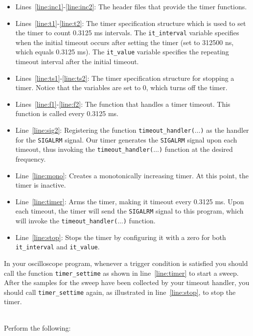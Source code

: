 \documentclass[epsfig,10pt,fullpage]{article}
\begin{document}
\begin{itemize}
\item Lines~\ref{line:inc1}-\ref{line:inc2}: The header files that provide the timer 
functions.
\item Lines~\ref{line:t1}-\ref{line:t2}: The timer specification structure which is used to set the timer to count 0.3125 ms intervals. The \texttt{it\_interval} variable specifies when the initial timeout occurs after setting the timer (set to 312500 ns, which equals 0.3125 ms). The \texttt{it\_value} variable specifies the repeating timeout interval after the initial timeout.
\item Lines~\ref{line:ts1}-\ref{line:ts2}: The timer specification structure for stopping a timer. Notice that the variables are set to 0, which turns off the timer.
\item Lines~\ref{line:f1}-\ref{line:f2}: The function that handles a timer timeout. This function is called every 0.3125 ms. 
\item Line~\ref{line:sig2}: Registering the function \texttt{timeout\_handler($\ldots$)} as 
the handler for the \texttt{SIGALRM} signal. Our timer generates the 
\texttt{SIGALRM} signal upon each timeout, thus invoking the
\texttt{timeout\_handler($\ldots$)} function at the desired frequency.
\item Line~\ref{line:mono}: Creates a monotonically increasing timer. At this point, the timer is inactive.
\item Line~\ref{line:timer}: Arms the timer, making it timeout every 0.3125 ms. Upon each 
timeout, the timer will send the \texttt{SIGALRM} signal to this program, which will invoke 
the \texttt{timeout\_handler($\ldots$)} function.
\item Line~\ref{line:stop}: Stops the timer by configuring it with a zero for both 
\texttt{it\_interval} and \texttt{it\_value}.
\end{itemize}

\noindent
In your oscilloscope program, whenever a trigger condition is satisfied you should call the 
function \texttt{timer\_settime} as shown in line~\ref{line:timer} to start a sweep. After the
samples for the sweep have been collected by your timeout handler, you should 
call \texttt{timer\_settime} again, as illustrated in line~\ref{line:stop}, to stop the timer.

~\\
\noindent
Perform the following:
\end{document}
